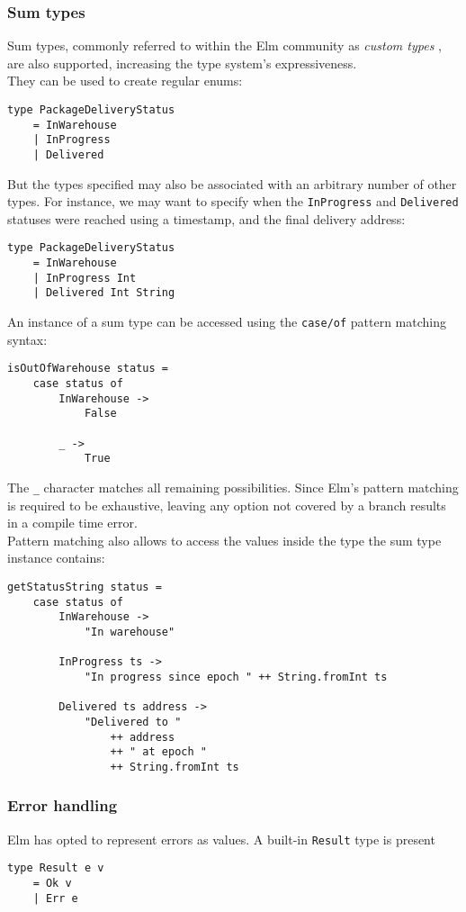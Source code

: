\subsubsection{Sum types}
Sum types, commonly referred to within the Elm community  as \textit{custom types} \cite{noauthor_custom_nodate}, are also supported, increasing the type system's expressiveness.\\

They can be used to create regular enums:
\begin{verbatim}
type PackageDeliveryStatus
    = InWarehouse
    | InProgress
    | Delivered
\end{verbatim}

But the types specified may also be associated with an arbitrary number of other types. For instance, we may want to specify when the \texttt{InProgress} and \texttt{Delivered} statuses were reached using a timestamp, and the final delivery address:
\begin{verbatim}
type PackageDeliveryStatus
    = InWarehouse
    | InProgress Int
    | Delivered Int String
\end{verbatim}

An instance of a sum type can be accessed using the \texttt{case/of} pattern matching syntax:
\begin{verbatim}
isOutOfWarehouse status =
    case status of
        InWarehouse ->
            False

        _ ->
            True
\end{verbatim}

The \texttt{\_} character matches all remaining possibilities. Since Elm's pattern matching is required to be exhaustive, leaving any option not covered by a branch results in a compile time error.\\

Pattern matching also allows to access the values inside the type the sum type instance contains:
\begin{verbatim}
getStatusString status =
    case status of
        InWarehouse ->
            "In warehouse"

        InProgress ts ->
            "In progress since epoch " ++ String.fromInt ts

        Delivered ts address ->
            "Delivered to "
                ++ address
                ++ " at epoch "
                ++ String.fromInt ts
\end{verbatim}

\subsubsection{Error handling}
Elm has opted to represent errors as values. A built-in \texttt{Result} type is present
\begin{verbatim}
type Result e v
    = Ok v
    | Err e
\end{verbatim}

